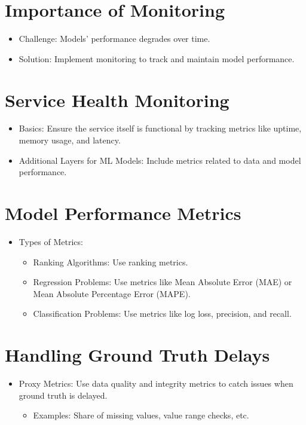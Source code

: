 \documentclass[letterpaper,12pt,notitlepage,twoside]{report}
\begin{document}
\section{Importance of Monitoring}
\begin{itemize}
    \item Challenge: Models' performance degrades over time.
    \item Solution: Implement monitoring to track and maintain model performance.
\end{itemize}

\section{Service Health Monitoring}
\begin{itemize}
    \item Basics: Ensure the service itself is functional by tracking metrics like uptime, memory usage, and latency.
    \item Additional Layers for ML Models: Include metrics related to data and model performance.
\end{itemize}

\section{Model Performance Metrics}
\begin{itemize}
    \item Types of Metrics:
    \begin{itemize}
        \item Ranking Algorithms: Use ranking metrics.
        \item Regression Problems: Use metrics like Mean Absolute Error (MAE) or Mean Absolute Percentage Error (MAPE).
        \item Classification Problems: Use metrics like log loss, precision, and recall.
    \end{itemize}
\end{itemize}

\section{Handling Ground Truth Delays}
\begin{itemize}
    \item Proxy Metrics: Use data quality and integrity metrics to catch issues when ground truth is delayed.
    \begin{itemize}
        \item Examples: Share of missing values, value range checks, etc.
    \end{itemize}
\end{itemize}
\end{document}
